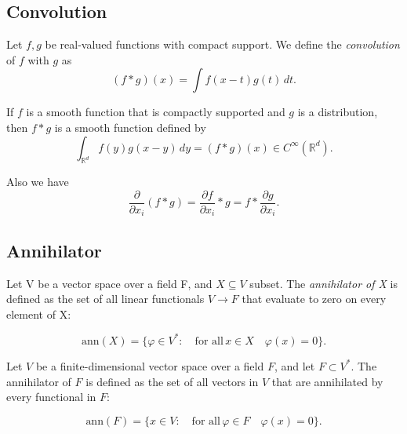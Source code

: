 \documentclass[../main.tex]{subfiles}
\begin{document}
\subsection{Convolution}
\begin{definition}
	Let $f,g$ be real-valued functions with compact support. We define the \emph{convolution} of $f$ with $g$ as $$(f\ast g)(x)=\int f(x-t)g(t) \, dt.$$
\end{definition}


\begin{propo} \cite{adams2003sobolev}
	If $f$ is a smooth function that is compactly supported and $g$ is a distribution, then $f\ast g$ is a smooth function defined by
	$${\displaystyle \int _{\mathbb {R} ^{d}}{f}(y)g(x-y)\,dy=(f*g)(x)\in C^{\infty }(\mathbb {R} ^{d}).} $$
	 \label{prop:29}
\end{propo}
\begin{propo} \label{prop:2} Also we have
	$${\frac {\partial }{\partial x_{i}}}(f*g)={\frac {\partial f}{\partial x_{i}}}*g=f*{\frac {\partial g}{\partial x_{i}}}.$$
\end{propo}

\subsection{Annihilator}

\begin{definition}  Let V be a vector space over a field F, and $X\subseteq V$ subset. The \textit{annihilator of X} is defined as the set of all linear functionals $V \rightarrow F$ that evaluate to zero on every element of X:
	
	$$ \text{ann}(X) = \{ \varphi \in V^* : \quad \text{for all} \,  x \in X \quad \varphi (x) = 0 \}.$$
\end{definition}


\begin{definition}  Let $V$ be a finite-dimensional vector space over a field $F$, and let $F \subset V^*$. The annihilator of $F$ is defined as the set of all vectors in $V$ that are annihilated by every functional in $F$:
	
	\[
	\text{ann}(F) = \{x \in V :\quad \text{for all} \, \varphi \in F \quad\varphi(x) = 0\}.
	\]
	
\end{definition}
\end{document}
